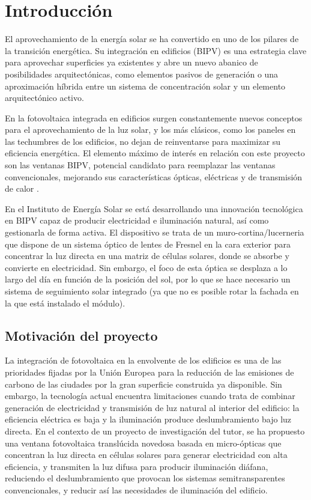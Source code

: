 \chapter{Introducción}\label{chapter:introduccion}


El aprovechamiento de la energía solar se ha convertido en uno de los pilares de la transición energética. Su integración en edificios (BIPV) es una estrategia clave para aprovechar superficies ya existentes y abre un nuevo abanico de posibilidades arquitectónicas, como elementos pasivos de generación o una aproximación híbrida entre un sistema de concentración solar y un elemento arquitectónico activo. 

En la fotovoltaica integrada en edificios surgen constantemente nuevos conceptos para el aprovechamiento de la luz solar, y los más clásicos, como los paneles en las techumbres de los edificios, no dejan de reinventarse para maximizar su eficiencia energética. El elemento máximo de interés en relación con este proyecto son las ventanas BIPV, potencial candidato para reemplazar las ventanas convencionales, mejorando sus características ópticas, eléctricas y de transmisión de calor \cite{su152215876}. 

En el Instituto de Energía Solar se está desarrollando una innovación tecnológica en BIPV capaz de producir electricidad e iluminación natural, así como gestionarla de forma activa. El dispositivo se trata de un muro-cortina/lucerneria que dispone de un sistema óptico de lentes de Fresnel en la cara exterior para concentrar la luz directa en una matriz de células solares, donde se absorbe y convierte en electricidad. Sin embargo, el foco de esta óptica se desplaza a lo largo del día en función de la posición del sol, por lo que se hace necesario un sistema de seguimiento solar integrado (ya que no es posible rotar la fachada en la que está instalado el módulo). 


\section{Motivación del proyecto}

La integración de fotovoltaica en la envolvente de los edificios es una de las prioridades fijadas por la Unión Europea para la reducción de las emisiones de carbono de las ciudades por la gran superficie construida ya disponible. Sin embargo, la tecnología actual encuentra limitaciones cuando trata de combinar generación de electricidad y transmisión de luz natural al interior del edificio: la eficiencia eléctrica es baja y la iluminación produce deslumbramiento bajo luz directa. En el contexto de un proyecto de investigación del tutor, se ha propuesto una ventana fotovoltaica translúcida novedosa basada en micro-ópticas que concentran la luz directa en células solares para generar electricidad con alta eficiencia, y transmiten la luz difusa para producir iluminación diáfana, reduciendo el deslumbramiento que provocan los sistemas semitransparentes convencionales, y reducir así las necesidades de iluminación del edificio. 

